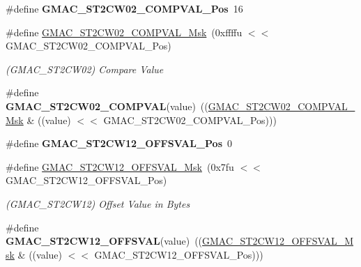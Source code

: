\begin{DoxyCompactItemize}
\item 
\mbox{\label{group__SAMV71__GMAC_gab424079c23d98f8a6c6e49f6665a3323}} 
\#define {\bfseries G\+M\+A\+C\+\_\+\+S\+T2\+C\+W02\+\_\+\+C\+O\+M\+P\+V\+A\+L\+\_\+\+Pos}~16
\item 
\mbox{\label{group__SAMV71__GMAC_ga9b6ea006951e9fd1a44e771612150433}} 
\#define \mbox{\hyperlink{group__SAMV71__GMAC_ga9b6ea006951e9fd1a44e771612150433}{G\+M\+A\+C\+\_\+\+S\+T2\+C\+W02\+\_\+\+C\+O\+M\+P\+V\+A\+L\+\_\+\+Msk}}~(0xffffu $<$$<$ G\+M\+A\+C\+\_\+\+S\+T2\+C\+W02\+\_\+\+C\+O\+M\+P\+V\+A\+L\+\_\+\+Pos)
\begin{DoxyCompactList}\small\item\em (G\+M\+A\+C\+\_\+\+S\+T2\+C\+W02) Compare Value \end{DoxyCompactList}\item 
\mbox{\label{group__SAMV71__GMAC_ga8da92c689de6e7c0e2697fac41eaa644}} 
\#define {\bfseries G\+M\+A\+C\+\_\+\+S\+T2\+C\+W02\+\_\+\+C\+O\+M\+P\+V\+AL}(value)~((\mbox{\hyperlink{group__SAMV71__GMAC_ga9b6ea006951e9fd1a44e771612150433}{G\+M\+A\+C\+\_\+\+S\+T2\+C\+W02\+\_\+\+C\+O\+M\+P\+V\+A\+L\+\_\+\+Msk}} \& ((value) $<$$<$ G\+M\+A\+C\+\_\+\+S\+T2\+C\+W02\+\_\+\+C\+O\+M\+P\+V\+A\+L\+\_\+\+Pos)))
\item 
\mbox{\label{group__SAMV71__GMAC_gacb62221fe252fe05198b07e20393c225}} 
\#define {\bfseries G\+M\+A\+C\+\_\+\+S\+T2\+C\+W12\+\_\+\+O\+F\+F\+S\+V\+A\+L\+\_\+\+Pos}~0
\item 
\mbox{\label{group__SAMV71__GMAC_ga95bfca3d28bc1c0f4d0b3971255161fa}} 
\#define \mbox{\hyperlink{group__SAMV71__GMAC_ga95bfca3d28bc1c0f4d0b3971255161fa}{G\+M\+A\+C\+\_\+\+S\+T2\+C\+W12\+\_\+\+O\+F\+F\+S\+V\+A\+L\+\_\+\+Msk}}~(0x7fu $<$$<$ G\+M\+A\+C\+\_\+\+S\+T2\+C\+W12\+\_\+\+O\+F\+F\+S\+V\+A\+L\+\_\+\+Pos)
\begin{DoxyCompactList}\small\item\em (G\+M\+A\+C\+\_\+\+S\+T2\+C\+W12) Offset Value in Bytes \end{DoxyCompactList}\item 
\mbox{\label{group__SAMV71__GMAC_gad354e4f5c8e423c82f9bd04b5ed78969}} 
\#define {\bfseries G\+M\+A\+C\+\_\+\+S\+T2\+C\+W12\+\_\+\+O\+F\+F\+S\+V\+AL}(value)~((\mbox{\hyperlink{group__SAMV71__GMAC_ga95bfca3d28bc1c0f4d0b3971255161fa}{G\+M\+A\+C\+\_\+\+S\+T2\+C\+W12\+\_\+\+O\+F\+F\+S\+V\+A\+L\+\_\+\+Msk}} \& ((value) $<$$<$ G\+M\+A\+C\+\_\+\+S\+T2\+C\+W12\+\_\+\+O\+F\+F\+S\+V\+A\+L\+\_\+\+Pos)))

\end{DoxyCompactItemize}

